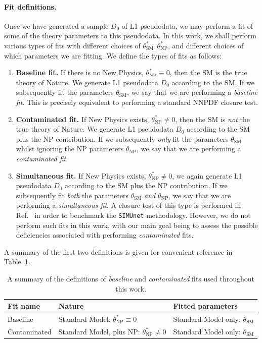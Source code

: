 \documentclass[withindex,glossary]{cam-thesis}
\begin{document}
\paragraph{Fit definitions.} 
Once we have generated a sample $D_0$ of L1 pseudodata, we may perform a fit of some of the theory parameters to this pseudodata. In this work, we shall perform various types of fits with different choices of $\theta_{\text{SM}}^*, \theta_{\text{NP}}^*$, and different choices of which parameters we are fitting. We define the types of fits as follows:
\begin{enumerate}[label = (\arabic*)]
\item \textbf{Baseline fit.} If there is no New Physics, $\theta_{\text{NP}}^* \equiv 0$, then the SM is the true theory of Nature. We generate L1 pseudodata $D_0$ according to the SM. If we subsequently fit the parameters $\theta_{\text{SM}}$, we say that we are performing a \textit{baseline fit}. This is precisely equivalent to performing a standard NNPDF closure test.
\item \textbf{Contaminated fit.} If New Physics exists, $\theta_{\text{NP}}^* \neq 0$, then the SM is \textit{not} the true theory of Nature. We generate L1 pseudodata $D_0$ according to the SM plus the NP contribution. If we subsequently \textit{only} fit the parameters $\theta_{\text{SM}}$ whilst ignoring the NP parameters $\theta_{\text{NP}}$, we say that we are performing a \textit{contaminated fit}.
\item \textbf{Simultaneous fit.} If New Physics exists, $\theta_{\text{NP}}^* \neq 0$, we again generate L1 pseudodata $D_0$ according to the SM plus the NP contribution. If we subsequently fit \textit{both} the parameters $\theta_{\text{SM}}$ \textit{and} $\theta_{\text{NP}}$, we say that we are performing a \textit{simultaneous fit}. A closure test of this type is performed in Ref.~\cite{Iranipour:2022iak} in order to benchmark the {\tt SIMUnet} methodology. However, we do not perform such fits in this work, with our main goal being to assess the possible deficiencies associated with performing \textit{contaminated} fits.
\end{enumerate}
A summary of the first two definitions is given for convenient reference in Table~\ref{table:definition}.



\begin{table}
  \centering
  \begin{tabular}{l|l|l}
    \toprule
    {\bf Fit name} & {\bf Nature}  & {\bf Fitted parameters}\\
    \midrule
    Baseline & Standard Model: $\theta_{\text{NP}}^* \equiv 0$ & Standard Model only: $\theta_{\text{SM}}$ \\
    Contaminated & Standard Model, plus NP: $\theta_{\text{NP}}^* \neq 0$ & Standard Model only: $\theta_{\text{SM}}$\\
    \bottomrule
    \end{tabular}
   \caption{\label{table:definition} A summary of the definitions of \textit{baseline} and \textit{contaminated} fits used throughout this work.}
  \end{table}
\end{document}

